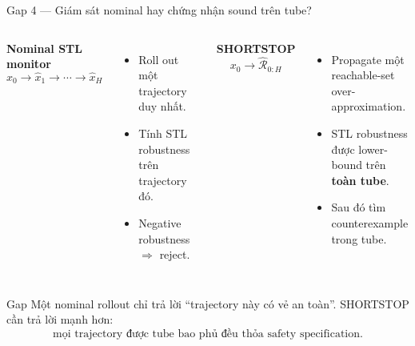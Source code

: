 \documentclass[aspectratio=169]{beamer}
\begin{document}
\begin{frame}[t,shrink=8]{Gap 4 --- Giám sát nominal hay chứng nhận sound trên tube?}
\begin{columns}[T]

\textbf{Nominal STL monitor}
\[
x_0
\rightarrow
\hat x_1
\rightarrow
\cdots
\rightarrow
\hat x_H
\]
\begin{itemize}
    \item Roll out một trajectory duy nhất.
    \item Tính STL robustness trên trajectory đó.
    \item Negative robustness $\Rightarrow$ reject.
\end{itemize}

\textbf{SHORTSTOP}
\[
x_0
\rightarrow
\boxed{
\hat{\mathcal R}_{0:H}
}
\]
\begin{itemize}
    \item Propagate một reachable-set over-approximation.
    \item STL robustness được lower-bound trên \textbf{toàn tube}.
    \item Sau đó tìm counterexample trong tube.
\end{itemize}

\end{columns}
\vspace{6pt}

\begin{alertblock}{Gap}
Một nominal rollout chỉ trả lời ``trajectory này có vẻ an toàn''.
SHORTSTOP cần trả lời mạnh hơn:
\[
\boxed{\text{mọi trajectory được tube bao phủ đều thỏa safety specification.}}
\]
\end{alertblock}
\end{frame}

\end{document}
